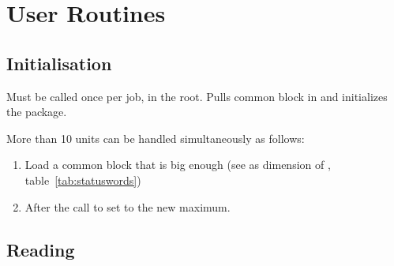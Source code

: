  
 
\chapter{User Routines}
\label{sec:H1Userroutines}

\section{Initialisation}
 
 
Must be called once per job, in the  root. Pulls common block
 in and initializes the package.
 
More than 10 units can be handled simultaneously as follows:
 
\begin{enumerate}
\item Load a common block  that is big enough 
      (see  as dimension of , 
       table~\ref{tab:statuswords})
\item After the call to  set  to the new maximum.
\end{enumerate}
 
\section{Reading}
 
 
